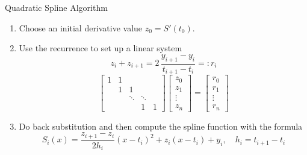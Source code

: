 \documentclass[10pt]{beamer}
\begin{document}
\begin{frame}{Quadratic Spline Algorithm}

\begin{enumerate}
    \item Choose an initial derivative value $z_0 = S'(t_0)$.
    \item Use the recurrence to set up a linear system 
    \[
    z_i + z_{i+1}
      =
    2\,\frac{y_{i+1}-y_i}{t_{i+1}-t_i} =: r_i
    \]
    $$
    \begin{bmatrix}
        1 &1 & & \\
          &1 &1& \\
          & &\ddots&\ddots \\
          & && 1&  1
    \end{bmatrix}\begin{bmatrix}
        z_0\\z_1\\\vdots\\z_n 
    \end{bmatrix} = \begin{bmatrix}
        r_0\\r_1\\\vdots\\r_n
    \end{bmatrix}
    $$
    \item Do back substitution and then compute the spline function with the formula 
        \[
        S_i(x)
        =
        \frac{z_{i+1}-z_i}{2h_i}(x-t_i)^2
        + z_i(x-t_i) + y_i, \quad h_i = t_{i+1}-t_i
        \]
\end{enumerate}
\end{frame}
\end{document}
